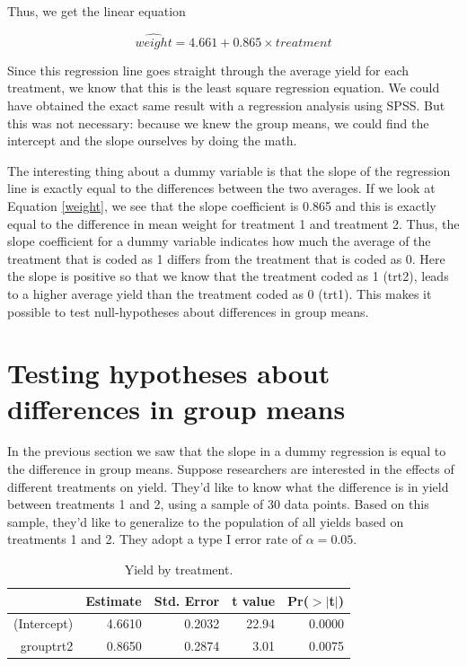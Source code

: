 \documentclass[]{report}\usepackage[]{graphicx}\usepackage[]{color}
\begin{document}
Thus, we get the linear equation 

\begin{equation}
\label{weight}
\widehat{weight} = 4.661 + 0.865\times treatment
\end{equation}

Since this regression line goes straight through the average yield for each treatment, we know that this is the least square regression equation. We could have obtained the exact same result with a regression analysis using SPSS. But this was not necessary: because we knew the group means, we could find the intercept and the slope ourselves by doing the math.  

The interesting thing about a dummy variable is that the slope of the regression line is exactly equal to the differences between the two averages. If we look at Equation \ref{weight}, we see that the slope coefficient is 0.865 and this is exactly equal to the difference in mean weight for treatment 1 and treatment 2. Thus, the slope coefficient for a dummy variable indicates how much the average of the treatment that is coded as 1 differs from the treatment that is coded as 0. Here the slope is positive so that we know that the treatment coded as 1 (trt2), leads to a higher average yield than the treatment coded as 0 (trt1). This makes it possible to test null-hypotheses about differences in group means.

\section{Testing hypotheses about differences in group means}

In the previous section we saw that the slope in a dummy regression is equal to the difference in group means. Suppose researchers are interested in the effects of different treatments on yield. They'd like to know what the difference is in yield between treatments 1 and 2, using a sample of 30 data points. Based on this sample, they'd like to generalize to the population of all yields based on treatments 1 and 2. They adopt a type I error rate of $\alpha=0.05$.


\begin{table}[ht]
\centering
\caption{Yield by treatment.} 
\label{tab:dummy_9}
\begin{tabular}{rrrrr}
  \hline
 & Estimate & Std. Error & t value & Pr($>$$|$t$|$) \\ 
  \hline
(Intercept) & 4.6610 & 0.2032 & 22.94 & 0.0000 \\ 
  grouptrt2 & 0.8650 & 0.2874 & 3.01 & 0.0075 \\ 
   \hline
\end{tabular}
\end{table}
\end{document}

